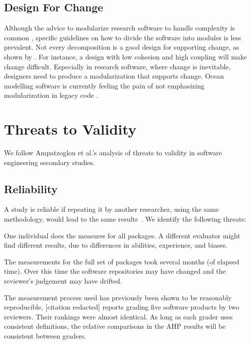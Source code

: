 \documentclass[doubleblind,12pt, 3p, times]{elsarticle}
\begin{document}
\subsection{Design For Change} \label{Sec_DesForChange}

 Although the advice to modularize research software to handle
complexity is common \cite{WilsonEtAl2014, StewartEtAl2017, Storer2017},
specific guidelines on how to divide the software into modules is less
prevalent.  Not every decomposition is a good design for supporting change, as
shown by \cite{Parnas1972a}.  For instance, a design with low cohesion and high
coupling \cite[p.\ 48]{GhezziEtAl2003} will make change difficult. Especially in
research software, where change is inevitable, designers need to produce a
modularization that supports change.  Ocean modelling software is currently
feeling the pain of not emphasizing modularization in legacy code
\cite{JungEtAl2022}.

\section{Threats to Validity} \label{sec_threats_to_validity}

We follow Ampatzoglou et al.'s \cite{AmpatzoglouEtAl2019} analysis of
threats to validity in software engineering secondary studies.

\subsection{Reliability}

A study is reliable if repeating it by another researcher, using the same
methodology, would lead to the same results~\cite{RunesonAndHost2009}.
We identify the following threats:
\begin{enumerate*}
\item One individual does the measures for all packages. A different
evaluator might find different results, due to differences in abilities,
experience, and biases.
\item The measurements for the full set of packages took several months (of
elapsed time).  Over this time the software repositories may have changed and
the reviewer's judgement may have drifted.
\end{enumerate*}

The measurement process used has previously been shown to be reasonably
reproducible, [citation redacted]
reports grading five software products by two reviewers. Their rankings were
almost identical. As long as each grader uses consistent definitions, the
relative comparisons in the AHP results will be consistent between graders.
\end{document}
